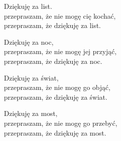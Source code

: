 \begin{text}
    Dziękuję za list.\\
    przepraszam, że nie mogę cię kochać,\\
    przepraszam, że dziękuję za list.

    Dziękuję za noc,\\
    przepraszam, że nie mogę jej przyjąć,\\
    przepraszam, że dziękuję za noc.

    Dziękuję za świat,\\
    przepraszam, że nie mogę go objąć,\\
    przepraszam, że dziękuję za świat.

    Dziękuję za most,\\
    przepraszam, że nie mogę go przebyć,\\
    przepraszam, że dziękuję za most.
\end{text}
\begin{chord}

\end{chord}